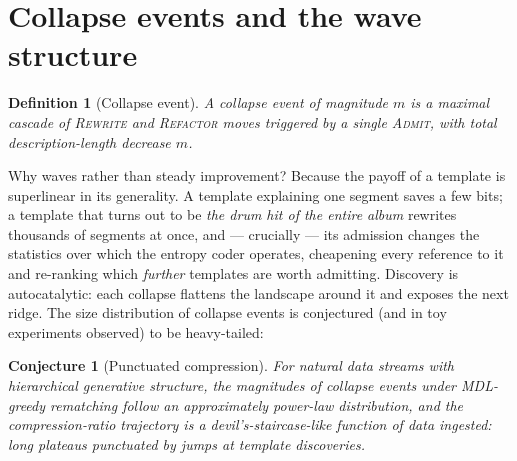 \documentclass[11pt,oneside]{book}
\newtheorem{definition}[theorem]{Definition}
\newtheorem{conjecture}[theorem]{Conjecture}
\theoremstyle{remark}
\begin{document}
\section{Collapse events and the wave structure}

\begin{definition}[Collapse event]
A collapse event of magnitude $m$ is a maximal cascade of
\textsc{Rewrite} and \textsc{Refactor} moves triggered by a single
\textsc{Admit}, with total description-length decrease $m$.
\end{definition}

Why waves rather than steady improvement? Because the payoff of a
template is superlinear in its generality. A template explaining one
segment saves a few bits; a template that turns out to be \emph{the
drum hit of the entire album} rewrites thousands of segments at once,
and --- crucially --- its admission changes the statistics over which
the entropy coder operates, cheapening every reference to it and
re-ranking which \emph{further} templates are worth admitting. Discovery
is autocatalytic: each collapse flattens the landscape around it and
exposes the next ridge. The size distribution of collapse events is
conjectured (and in toy experiments observed) to be heavy-tailed:

\begin{conjecture}[Punctuated compression]
For natural data streams with hierarchical generative structure, the
magnitudes of collapse events under MDL-greedy rematching follow an
approximately power-law distribution, and the compression-ratio
trajectory is a devil's-staircase-like function of data ingested:
long plateaus punctuated by jumps at template discoveries.
\end{conjecture}
\end{document}
